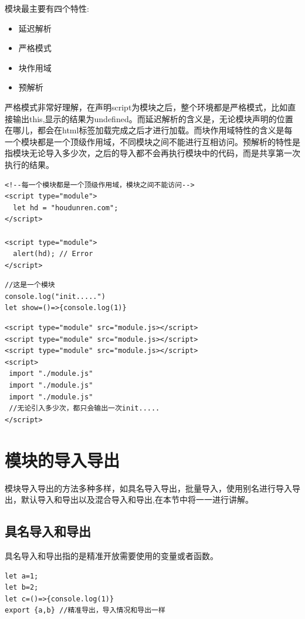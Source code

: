 \documentclass[
	11pt,
	fleqn,
	a4paper,
]{LegrandOrangeBook}
\begin{document}
模块最主要有四个特性:
\begin{itemize}
    \item 延迟解析
    \item 严格模式
    \item 块作用域
    \item 预解析
\end{itemize}
严格模式非常好理解，在声明script为模块之后，整个环境都是严格模式，比如直接输出this,显示的结果为undefined。而延迟解析的含义是，无论模块声明的位置在哪儿，都会在html标签加载完成之后才进行加载。而块作用域特性的含义是每一个模块都是一个顶级作用域，不同模块之间不能进行互相访问。预解析的特性是指模块无论导入多少次，之后的导入都不会再执行模块中的代码，而是共享第一次执行的结果。
\begin{verbatim}
<!--每一个模块都是一个顶级作用域，模块之间不能访问-->
<script type="module">
  let hd = "houdunren.com";
</script>

<script type="module">
  alert(hd); // Error
</script>
\end{verbatim}

\begin{verbatim}
//这是一个模块
console.log("init.....")
let show=()=>{console.log(1)}
\end{verbatim}
\begin{verbatim}
<script type="module" src="module.js></script>
<script type="module" src="module.js></script>
<script type="module" src="module.js></script>
<script>
 import "./module.js"
 import "./module.js"
 import "./module.js"
 //无论引入多少次，都只会输出一次init.....
</script>
\end{verbatim}
\section{模块的导入导出}
模块导入导出的方法多种多样，如具名导入导出，批量导入，使用别名进行导入导出，默认导入和导出以及混合导入和导出,在本节中将一一进行讲解。
\subsection{具名导入和导出}
具名导入和导出指的是精准开放需要使用的变量或者函数。
\begin{verbatim}
let a=1;
let b=2;
let c=()=>{console.log(1)}
export {a,b} //精准导出，导入情况和导出一样
\end{verbatim}
\end{document}
